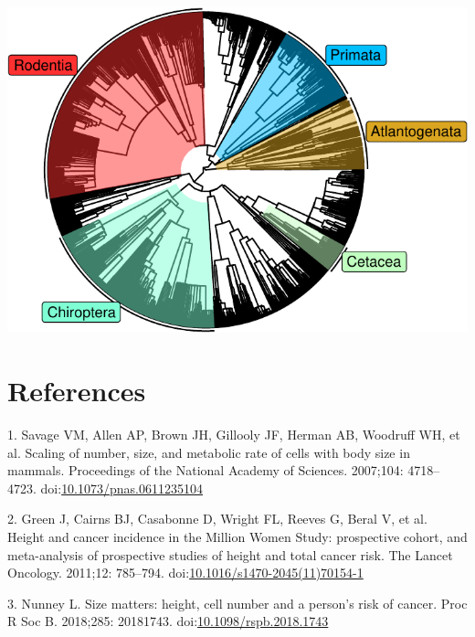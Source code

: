 \documentclass[]{elsarticle} %
\let\origfigure\figure
\let\endorigfigure\endfigure
\renewenvironment{figure}[1][2] {
    \expandafter\origfigure\expandafter[H]
} {
    \endorigfigure
}
\begin{document}
\begin{figure}[H]
\includegraphics[width=6in,]{paper_PLOS_draft_files/figure-latex/Figure-TimeTree-Eutheria-1} \caption{The time-calibrated Eutherian tree used as input for StableTraits, from Bininda-Emonds et al and Puttick and Thomas}\label{fig:Figure-TimeTree-Eutheria}
\end{figure}

\hypertarget{references}{%
\section*{References}\label{references}}

\hypertarget{refs}{}
\leavevmode\hypertarget{ref-Savage2007}{}%
1. Savage VM, Allen AP, Brown JH, Gillooly JF, Herman AB, Woodruff WH, et al. Scaling of number, size, and metabolic rate of cells with body size in mammals. Proceedings of the National Academy of Sciences. 2007;104: 4718--4723. doi:\href{https://doi.org/10.1073/pnas.0611235104}{10.1073/pnas.0611235104}

\leavevmode\hypertarget{ref-Green2011}{}%
2. Green J, Cairns BJ, Casabonne D, Wright FL, Reeves G, Beral V, et al. Height and cancer incidence in the Million Women Study: prospective cohort, and meta-analysis of prospective studies of height and total cancer risk. The Lancet Oncology. 2011;12: 785--794. doi:\href{https://doi.org/10.1016/s1470-2045(11)70154-1}{10.1016/s1470-2045(11)70154-1}

\leavevmode\hypertarget{ref-Nunney:20181c2}{}%
3. Nunney L. Size matters: height, cell number and a person's risk of cancer. Proc R Soc B. 2018;285: 20181743. doi:\href{https://doi.org/10.1098/rspb.2018.1743}{10.1098/rspb.2018.1743}
\end{document}
